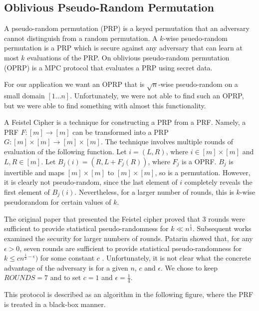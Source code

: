 \subsection{Oblivious Pseudo-Random Permutation}

A pseudo-random permutation (PRP) is a keyed permutation
that an adversary cannot distinguish from a random permutation.
A $k$-wise psuedo-random permutation is a PRP which is secure against
any adversary that can learn at most $k$ evaluations of the PRP.
On oblivious pseudo-random permutation (OPRP) is a MPC protocol
that evaluates a PRP using secret data.

For our application we want an OPRP that is $\sqrt{n}$-wise pseudo-random
on a small domain $[1 \ldots n]$. 
Unfortunately, we were not able to find such an OPRP, but we were able
to find something with almost this functionality.

A Feistel Cipher is a technique for constructing a PRP from a PRF.
Namely, a PRF $F : [m] \rightarrow[m]$ can be transformed
into a PRP $G : [m] \times [m] \rightarrow [m] \times [m]$. 
The technique involves multiple rounds of evaluation of the following function.
Let $i = (L, R)$, where $i \in [m] \times [m]$ and $L, R \in [m]$.
Let $B_j(i) = (R, L + F_j(R))$, where $F_j$ is a OPRF.
$B_j$ is invertible and maps $[m] \times [m]$ to $[m] \times [m]$, 
so is a permutation.
However, it is clearly not pseudo-random, since the last element of $i$ 
completely reveals the first element of $B_j(i)$.
Nevertheless, for a larger number of rounds, this is $k$-wise 
pseudorandom for certain values of $k$.

The original paper that presented the Feistel cipher \cite{luby1988construct}
proved that 3 rounds were sufficient to provide statistical pseudo-randomness
for $k \ll n^{\frac{1}{4}}$.
Subsequent works examined the security for larger numbers of rounds.
Patarin showed that, for any $\epsilon > 0$,
seven rounds are sufficient to provide statistical pseudo-randomness for 
$k \leq c n^{\frac{1}{2} - \epsilon})$ for some constant $c$ 
\cite{patarin2003luby}.
Unfortunately, it is not clear what the concrete advantage of the
adversary is for a given $n$, $c$ and $\epsilon$.
We chose to keep $ROUNDS=7$ and to set $c=1$ and $\epsilon = \frac{1}{4}$.

This protocol is described as an algorithm in the following figure,
where the PRF is treated in a black-box manner.

